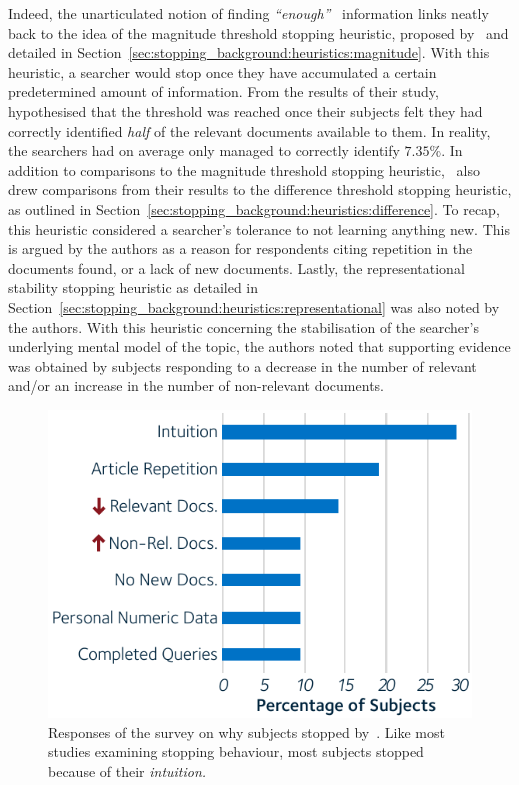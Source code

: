 Indeed, the unarticulated notion of finding \emph{``enough''}~\citep{zach2005enough_is_enough} information links neatly back to the idea of the magnitude threshold stopping heuristic, proposed by~\cite{nickles1995judgment} and detailed in Section~\ref{sec:stopping_background:heuristics:magnitude}. With this heuristic, a searcher would stop once they have accumulated a certain predetermined amount of information. From the results of their study,~\cite{dostert2009satisficing} hypothesised that the threshold was reached once their subjects felt they had correctly identified \emph{half} of the relevant documents available to them. In reality, the searchers had on average only managed to correctly identify $7.35\%$. In addition to comparisons to the magnitude threshold stopping heuristic,~\cite{dostert2009satisficing} also drew comparisons from their results to the difference threshold stopping heuristic, as outlined in Section~\ref{sec:stopping_background:heuristics:difference}. To recap, this heuristic considered a searcher's tolerance to not learning anything new. This is argued by the authors as a reason for respondents citing repetition in the documents found, or a lack of new documents. Lastly, the representational stability stopping heuristic as detailed in Section~\ref{sec:stopping_background:heuristics:representational} was also noted by the authors. With this heuristic concerning the stabilisation of the searcher's underlying mental model of the topic, the authors noted that supporting evidence was obtained by subjects responding to a decrease in the number of relevant and/or an increase in the number of non-relevant documents.

\begin{figure}
    \begin{center}
    \vspace*{-10mm}
    \includegraphics[width=1\textwidth]{figures/ch3-respondents.pdf}
    \end{center}
    \vspace*{-4mm}
    \caption[Responses of a survey by~\cite{dostert2009satisficing}]{Responses of the survey on why subjects stopped by~\cite{dostert2009satisficing}. Like most studies examining stopping behaviour, most subjects stopped because of their \emph{intuition.}}
    \label{fig:stopping_respondents}
\end{figure}

